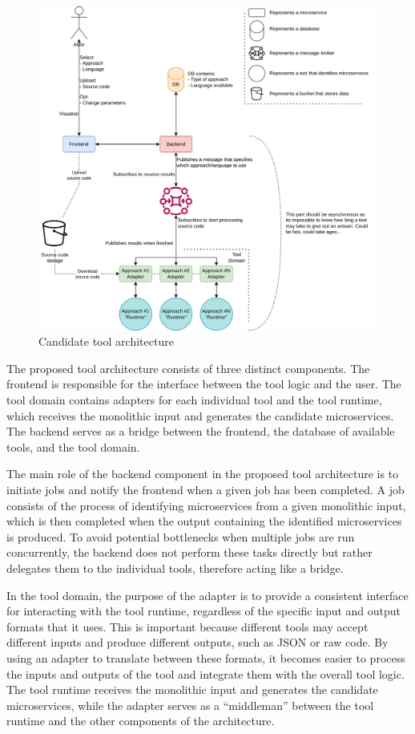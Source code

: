 \documentclass[conference]{IEEEtran}
\begin{document}
\begin{figure}[!htb]
  \caption{Candidate tool architecture}
  \label{fig:tool-architecture}
  \centering
  \includegraphics[width=\textwidth]{thesis-architecture.drawio}
\end{figure}

The proposed tool architecture consists of three distinct components. The
frontend is responsible for the interface between the tool logic and the user.
The tool domain contains adapters for each individual tool and the tool
runtime, which receives the monolithic input and generates the candidate
microservices. The backend serves as a bridge between the frontend, the
database of available tools, and the tool domain.

The main role of the backend component in the proposed tool architecture is to
initiate jobs and notify the frontend when a given job has been completed. A
job consists of the process of identifying microservices from a given
monolithic input, which is then completed when the output containing the
identified microservices is produced. To avoid potential bottlenecks when
multiple jobs are run concurrently, the backend does not perform these tasks
directly but rather delegates them to the individual tools, therefore acting
like a bridge.

In the tool domain, the purpose of the adapter is to provide a consistent
interface for interacting with the tool runtime, regardless of the specific
input and output formats that it uses. This is important because different
tools may accept different inputs and produce different outputs, such as JSON
or raw code. By using an adapter to translate between these formats, it becomes
easier to process the inputs and outputs of the tool and integrate them with
the overall tool logic. The tool runtime receives the monolithic input and
generates the candidate microservices, while the adapter serves as a
``middleman'' between the tool runtime and the other components of the
architecture.
\end{document}
